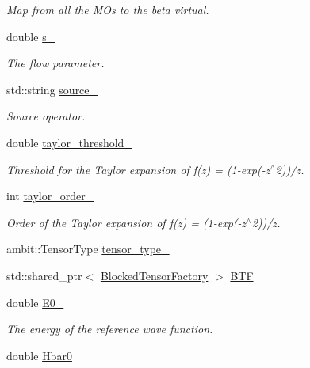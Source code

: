 \begin{DoxyCompactItemize}
\begin{DoxyCompactList}\small\item\em Map from all the M\+Os to the beta virtual. \end{DoxyCompactList}\item 
double \mbox{\hyperlink{classforte_1_1_s_o_m_r_d_s_r_g_aa9608896acacde81ac6a724346e98d6c}{s\+\_\+}}
\begin{DoxyCompactList}\small\item\em The flow parameter. \end{DoxyCompactList}\item 
std\+::string \mbox{\hyperlink{classforte_1_1_s_o_m_r_d_s_r_g_a3bf6768f5ce2f233f90144762cf74819}{source\+\_\+}}
\begin{DoxyCompactList}\small\item\em Source operator. \end{DoxyCompactList}\item 
double \mbox{\hyperlink{classforte_1_1_s_o_m_r_d_s_r_g_a26f0ec7df9dc36c502d29d25b87c7414}{taylor\+\_\+threshold\+\_\+}}
\begin{DoxyCompactList}\small\item\em Threshold for the Taylor expansion of f(z) = (1-\/exp(-\/z$^\wedge$2))/z. \end{DoxyCompactList}\item 
int \mbox{\hyperlink{classforte_1_1_s_o_m_r_d_s_r_g_a336f4a42e43533ac920f2ed033780171}{taylor\+\_\+order\+\_\+}}
\begin{DoxyCompactList}\small\item\em Order of the Taylor expansion of f(z) = (1-\/exp(-\/z$^\wedge$2))/z. \end{DoxyCompactList}\item 
ambit\+::\+Tensor\+Type \mbox{\hyperlink{classforte_1_1_s_o_m_r_d_s_r_g_a8e981efd67c239545719e81d04409014}{tensor\+\_\+type\+\_\+}}
\item 
std\+::shared\+\_\+ptr$<$ \mbox{\hyperlink{classforte_1_1_blocked_tensor_factory}{Blocked\+Tensor\+Factory}} $>$ \mbox{\hyperlink{classforte_1_1_s_o_m_r_d_s_r_g_a939eb08c348f7bdaffd296711de6dc12}{B\+TF}}
\item 
double \mbox{\hyperlink{classforte_1_1_s_o_m_r_d_s_r_g_af257731fdbc65f56739e08461e78787e}{E0\+\_\+}}
\begin{DoxyCompactList}\small\item\em The energy of the reference wave function. \end{DoxyCompactList}\item 
double \mbox{\hyperlink{classforte_1_1_s_o_m_r_d_s_r_g_ae1904f808627720a8cf9e7f04757603c}{Hbar0}}

\end{DoxyCompactItemize}
